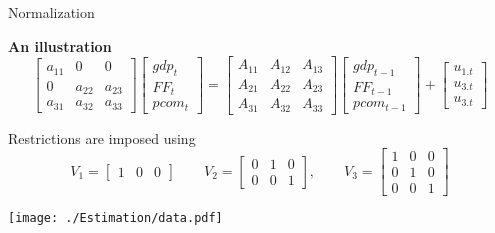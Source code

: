 \documentclass[notes,blackandwhite,mathsans,usenames,dvipsnames]{beamer}
\begin{document}
\begin{frame}{Normalization}

\bigskip\textbf{An illustration}
\small
\begin{equation*}
\begin{bmatrix}a_{11}&0&0\\ 0& a_{22}&a_{23}\\a_{31}& a_{32}&a_{33} \end{bmatrix}\begin{bmatrix} gdp_t \\ FF_t \\ pcom_t \end{bmatrix} = \begin{bmatrix} A_{11}& A_{12}& A_{13}\\  A_{21}& A_{22}& A_{23}\\ A_{31}& A_{32}& A_{33} \end{bmatrix}\begin{bmatrix} gdp_{t-1} \\ FF_{t-1} \\ pcom_{t-1} \end{bmatrix} + \begin{bmatrix}  u_{1.t}\\ u_{3.t}\\ u_{3.t}\end{bmatrix}
\end{equation*}

\bigskip\normalsize {\color{mcxs2}Restrictions are imposed using} \small
$$V_1 = \begin{bmatrix}  1&0&0 \end{bmatrix} \qquad V_2 = \begin{bmatrix}  0&1&0 \\ 0&0&1 \end{bmatrix}, \qquad V_3 = \begin{bmatrix}  1&0&0 \\ 0&1&0 \\ 0&0&1 \end{bmatrix}$$

\begin{center}
\texttt{[image: ./Estimation/data.pdf]}
\end{center}


\end{frame}
\end{document}
